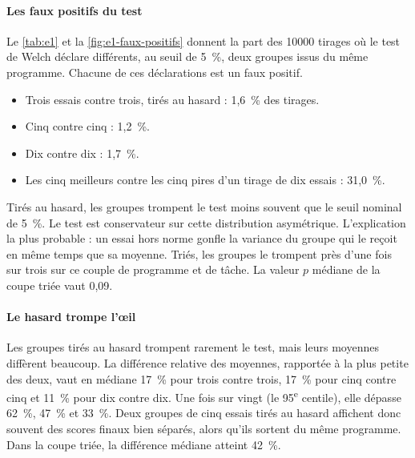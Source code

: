 \paragraph{Les faux positifs du test}
Le \cref{tab:e1} et la \cref{fig:e1-faux-positifs} donnent la part des \num{10000} tirages où le test de Welch
déclare différents, au seuil de 5~\%, deux groupes issus du même programme. Chacune de ces déclarations est un
faux positif.
\begin{itemize}
  \item Trois essais contre trois, tirés au hasard : 1,6~\% des tirages.
  \item Cinq contre cinq : 1,2~\%.
  \item Dix contre dix : 1,7~\%.
  \item Les cinq meilleurs contre les cinq pires d'un tirage de dix essais : 31,0~\%.
\end{itemize}
Tirés au hasard, les groupes trompent le test moins souvent que le seuil nominal de 5~\%. Le test est
conservateur sur cette distribution asymétrique. L'explication la plus probable : un essai hors norme gonfle
la variance du groupe qui le reçoit en même temps que sa moyenne. Triés, les groupes le trompent près d'une
fois sur trois sur ce couple de programme et de tâche. La valeur $p$ médiane de la coupe triée vaut 0,09.



\paragraph{Le hasard trompe l'œil}
Les groupes tirés au hasard trompent rarement le test, mais leurs moyennes diffèrent beaucoup. La différence
relative des moyennes, rapportée à la plus petite des deux, vaut en médiane 17~\% pour trois contre trois,
17~\% pour cinq contre cinq et 11~\% pour dix contre dix. Une fois sur vingt (le 95\textsuperscript{e}
centile), elle dépasse 62~\%, 47~\% et 33~\%. Deux groupes de cinq essais tirés au hasard affichent donc
souvent des scores finaux bien séparés, alors qu'ils sortent du même programme. Dans la coupe triée, la
différence médiane atteint 42~\%.

